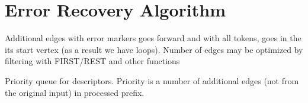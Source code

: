 \section{Error Recovery Algorithm}



Additional edges with error markers goes forward and with all tokens, goes in the its start vertex 
(as a result we have loops).
Number of edges may be optimized by filtering with FIRST/REST and other functions

Priority queue for descriptors. 
Priority is a number of additional edges (not from the original input) in processed prefix.